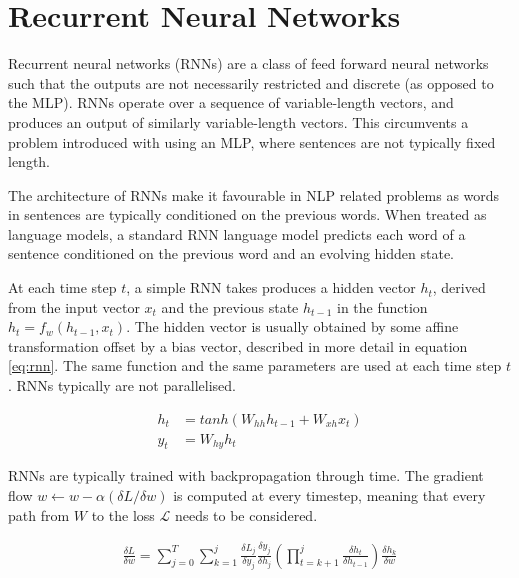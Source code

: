 \documentclass[12pt,twoside]{report}
\begin{document}

\section{Recurrent Neural Networks}
\label{rnn}
Recurrent neural networks (RNNs) are a class of feed forward neural networks such that the outputs are not necessarily restricted and discrete (as opposed to the MLP). RNNs operate over a sequence of variable-length vectors, and produces an output of similarly variable-length vectors. This circumvents a problem introduced with using an MLP, where sentences are not typically fixed length. 

The architecture of RNNs make it favourable in NLP related problems as words in sentences are typically conditioned on the previous words. When treated as language models, a standard RNN language model predicts each word of a sentence conditioned on the previous word and an evolving hidden state.

At each time step $t$, a simple RNN takes produces a hidden vector $h_t$, derived from the input vector $x_t$ and the previous state $h_{t-1}$ in the function $h_t = f_w(h_{t-1}, x_t)$. The hidden vector is usually obtained by some affine transformation offset by a bias vector, described in more detail in equation \ref{eq:rnn}. The same function and the same parameters are used at each time step $t$. RNNs typically are not parallelised. 

\begin{equation}
	\label{eq:rnn}
	\begin{aligned}
		h_t &= tanh(W_{hh}h_{t-1}+W_{xh}x_t)
	\\
	y_t &= W_{hy}h_t
	\end{aligned}
	\end{equation}

RNNs are typically trained with backpropagation through time. The gradient flow $w \leftarrow w - \alpha ({\delta L}/{\delta w})$ is computed at every timestep, meaning that every path from $W$ to the loss $\mathcal{L}$ needs to be considered.

\begin{equation}
	\label{eq:btt}
	\begin{aligned}
		\frac{\delta L}{\delta w} = \sum^T_{j=0}\sum^j_{k=1}\frac{\delta L_j}{\delta y_j}\frac{\delta y_j}{\delta h_j}(\prod^j_{t=k+1}\frac{\delta h_t}{\delta h_{t-1}})\frac{\delta h_k}{\delta w}
	\end{aligned}
	\end{equation}
\end{document}
